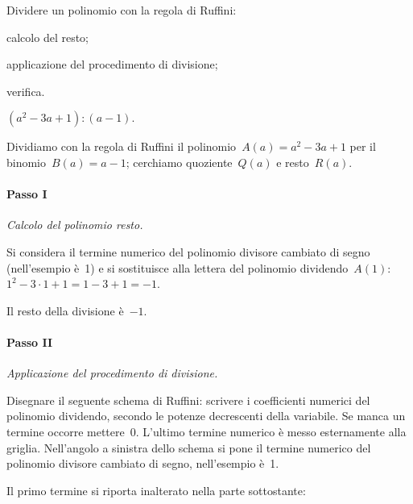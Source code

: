 \begin{procedura}
 Dividere un polinomio con la regola di Ruffini:

 \begin{enumeratea}
 \item calcolo del resto;
\item applicazione del procedimento di divisione;
\item verifica.
 \end{enumeratea}
\end{procedura}


\begin{exrig}
 \begin{esempio}
$\left(a^{2}-3a+1\right):(a-1).$

Dividiamo con la regola di Ruffini il polinomio~$A(a)=a^{2}-3a+1$ per
il binomio~$B(a)=a-1$; cerchiamo quoziente~$Q(a)$ e resto~$R(a)$.

\paragraph{Passo I} \emph{Calcolo del polinomio resto.}

Si considera il termine numerico del polinomio divisore cambiato di
segno (nell'esempio è~1) e si sostituisce alla
lettera del polinomio dividendo~$A(1)$:~$1^{2}-3\cdot 1 + 1 = 1 - 3 + 1 = -1$.

Il resto della divisione è~$-1$.

\paragraph{Passo II} \emph{Applicazione del procedimento di divisione.}

Disegnare il seguente schema di Ruffini: scrivere i coefficienti
numerici del polinomio dividendo, secondo le potenze decrescenti della
variabile. Se manca un termine occorre mettere~0.
L'ultimo termine numerico è messo esternamente alla
griglia. Nell'angolo a sinistra dello schema si pone il
termine numerico del polinomio divisore cambiato di segno,
nell'esempio è~1.

\begin{center}

\end{center}

\begin{multicols}{2}
 Il primo termine si riporta inalterato nella parte sottostante:
\begin{center}

\end{center}
\end{multicols}


\end{esempio}
\end{exrig}
